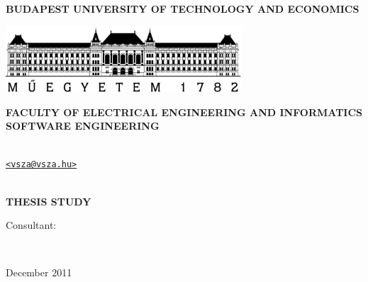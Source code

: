 \begin{center}

\textbf{BUDAPEST UNIVERSITY OF TECHNOLOGY AND ECONOMICS}

\medskip

\includegraphics[width=8.79cm]{images/bme.pdf}

\medskip

\textbf{FACULTY OF ELECTRICAL ENGINEERING AND INFORMATICS\\SOFTWARE ENGINEERING}

 \vspace{2cm}
 \Large\textbf{\cim}

 \vspace{6mm}
 \textbf{\nev} \\
 \texttt{\href{mailto:vsza@vsza.hu}{<vsza@vsza.hu>}} \\ \strut \\

 \Large\textbf{THESIS STUDY}

\end{center}

\vfill

Consultant:

\begin{center}
\konzulens\\ \konzbeoszt

\vspace{96pt}

December 2011
\end{center}

